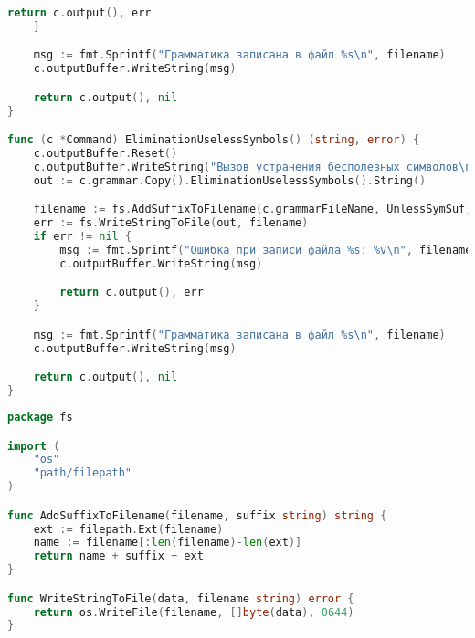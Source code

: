 \begin{lstlisting}[language=Go, caption={Код модуля \textit{commands}}]
		return c.output(), err
	}

	msg := fmt.Sprintf("Грамматика записана в файл %s\n", filename)
	c.outputBuffer.WriteString(msg)

	return c.output(), nil
}

func (c *Command) EliminationUselessSymbols() (string, error) {
	c.outputBuffer.Reset()
	c.outputBuffer.WriteString("Вызов устранения бесполезных символов\n")
	out := c.grammar.Copy().EliminationUselessSymbols().String()

	filename := fs.AddSuffixToFilename(c.grammarFileName, UnlessSymSuf)
	err := fs.WriteStringToFile(out, filename)
	if err != nil {
		msg := fmt.Sprintf("Ошибка при записи файла %s: %v\n", filename, err)
		c.outputBuffer.WriteString(msg)

		return c.output(), err
	}

	msg := fmt.Sprintf("Грамматика записана в файл %s\n", filename)
	c.outputBuffer.WriteString(msg)

	return c.output(), nil
}
\end{lstlisting}

\begin{lstlisting}[language=Go, caption={Код модуля \textit{fs}}, label=lst2]
package fs

import (
	"os"
	"path/filepath"
)

func AddSuffixToFilename(filename, suffix string) string {
	ext := filepath.Ext(filename)
	name := filename[:len(filename)-len(ext)]
	return name + suffix + ext
}

func WriteStringToFile(data, filename string) error {
	return os.WriteFile(filename, []byte(data), 0644)
}

\end{lstlisting}


\newpage